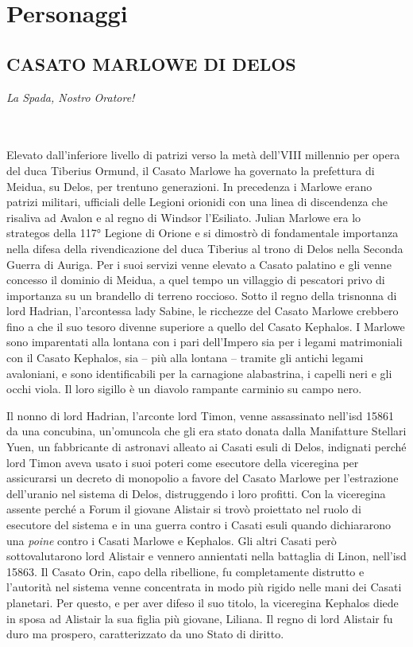 \backmatter

\chapter{Personaggi}

\section{CASATO MARLOWE DI DELOS}

\begin{center}
	\emph{La Spada, Nostro Oratore!}
\end{center}
\leavevmode\\
\leavevmode\\
Elevato dall'inferiore livello di patrizi verso la metà dell'VIII
millennio per opera del duca Tiberius Ormund, il Casato Marlowe ha
governato la prefettura di Meidua, su Delos, per trentuno generazioni.
In precedenza i Marlowe erano patrizi militari, ufficiali delle Legioni
orionidi con una linea di discendenza che risaliva ad Avalon e al regno
di Windsor l'Esiliato. Julian Marlowe era lo strategos della 117°
Legione di Orione e si dimostrò di fondamentale importanza nella difesa
della rivendicazione del duca Tiberius al trono di Delos nella Seconda
Guerra di Auriga. Per i suoi servizi venne elevato a Casato palatino e
gli venne concesso il dominio di Meidua, a quel tempo un villaggio di
pescatori privo di importanza su un brandello di terreno roccioso. Sotto
il regno della trisnonna di lord Hadrian, l'arcontessa lady Sabine, le
ricchezze del Casato Marlowe crebbero fino a che il suo tesoro divenne
superiore a quello del Casato Kephalos. I Marlowe sono imparentati alla
lontana con i pari dell'Impero sia per i legami matrimoniali con il
Casato Kephalos, sia -- più alla lontana -- tramite gli antichi legami
avaloniani, e sono identificabili per la carnagione alabastrina, i
capelli neri e gli occhi viola. Il loro sigillo è un diavolo rampante
carminio su campo nero.

Il nonno di lord Hadrian, l'arconte lord Timon, venne assassinato
nell'\foreignlanguage{italian}{isd} 15861 da una concubina, un'omuncola
che gli era stato donata dalla Manifatture Stellari Yuen, un fabbricante
di astronavi alleato ai Casati esuli di Delos, indignati perché lord
Timon aveva usato i suoi poteri come esecutore della viceregina per
assicurarsi un decreto di monopolio a favore del Casato Marlowe per
l'estrazione dell'uranio nel sistema di Delos, distruggendo i loro
profitti. Con la viceregina assente perché a Forum il giovane Alistair
si trovò proiettato nel ruolo di esecutore del sistema e in una guerra
contro i Casati esuli quando dichiararono una \emph{poine} contro i
Casati Marlowe e Kephalos. Gli altri Casati però sottovalutarono lord
Alistair e vennero annientati nella battaglia di Linon,
nell'\foreignlanguage{italian}{isd} 15863. Il Casato Orin, capo della
ribellione, fu completamente distrutto e l'autorità nel sistema venne
concentrata in modo più rigido nelle mani dei Casati planetari. Per
questo, e per aver difeso il suo titolo, la viceregina Kephalos diede in
sposa ad Alistair la sua figlia più giovane, Liliana. Il regno di lord
Alistair fu duro ma prospero, caratterizzato da uno Stato di diritto.

